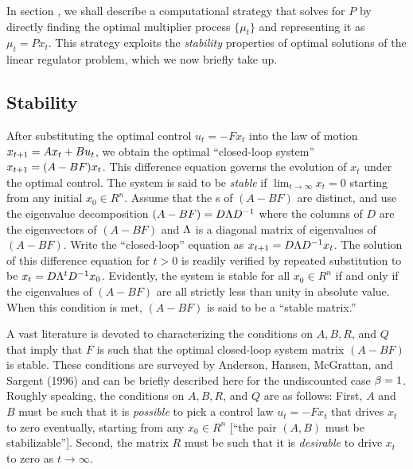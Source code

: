 In section , we shall  describe a computational strategy
that solves for $P$ by directly finding the optimal  multiplier process
$\{\mu_t\}$ and representing it as $\mu_t = P x_t$.  This
strategy exploits the {\it stability} properties of optimal
solutions of the linear regulator problem, which we now briefly
take up.  
\subsection{Stability}\label{sec:ch4stable}%
After substituting the optimal control $u_t=-Fx_t$ into the
law of motion $x_{{t+1}}=Ax_t+Bu_t$, we obtain the optimal
``closed-loop system'' $x_{{t+1}}=(A-BF)x_t$.  This difference
equation governs the evolution of $x_t$ under the optimal
control.  The system is said to be {\it stable\/} if $\lim_{t\to\infty}
x_t=0$ starting from any initial $x_0\in R^n$.  Assume that the
s of $(A-BF)$ are distinct, and use the eigenvalue
decomposition $(A-BF)=D{\Lambda} D^{-1}$ where the columns of $D$
are the eigenvectors of $(A-BF)$ and ${\Lambda}$ is a diagonal
matrix of eigenvalues of $(A-BF)$.   Write the ``closed-loop'' equation
as $x_{{t+1}}=D{\Lambda} D^{-1} x_t$.  The solution of this difference
equation for $t>0$ is readily verified by repeated substitution
to be $x_t=D{\Lambda}^t D^{-1} x_0$.  Evidently, the system is stable
for all $x_0\in R^n$ if and only if the eigenvalues  of $(A-BF)$
are all strictly less than unity in
absolute value.  When this condition is met, $(A-BF)$ is said
to be a ``stable matrix.''

A vast
literature is devoted to characterizing the conditions on $A,B,R$, and $Q$
that imply that $F$ is such that the optimal closed-loop system matrix $(A-BF)$ is stable.  These
conditions are surveyed by Anderson, Hansen,
McGrattan, and Sargent (1996) and can be briefly described
here for the undiscounted case ${\beta}=1$.  Roughly speaking,
 the conditions on
$A,B,R$, and $Q$ are as follows:  First, $A$
and $B$ must be such that it is {\it possible\/} to pick a control law
$u_t=-Fx_t$ that drives $x_t$ to zero eventually, starting from any $x_0\in
R^n$ [``the pair $(A,B)$ must be stabilizable''].  Second, the matrix $R$ must
be such that it is {\it desirable\/} to drive $x_t$ to zero as
$t\to\infty$.

